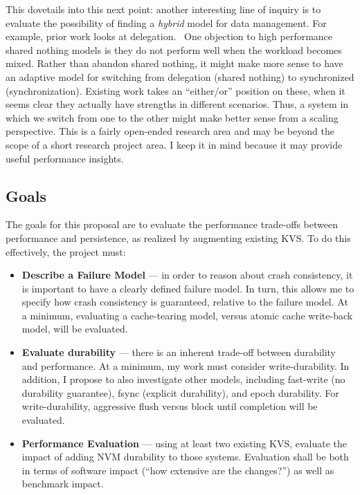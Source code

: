 \documentclass[letterpaper,twocolumn,10pt]{article}
\begin{document}
This dovetails into this next point: another interesting line of inquiry is to evaluate the possibility of finding a \textit{hybrid} model for
data management.  For example, prior work
looks at delegation.~\cite{roghanchi2017ffwd,calciu2013message}  One objection to high performance shared nothing models is they do not perform well
when the workload becomes mixed.  Rather than abandon shared nothing, it might make more sense to have an adaptive model for switching from delegation
(shared nothing) to synchronized (synchronization).  Existing work takes an ``either/or'' position on these, when it seems clear they actually have
strengths in different scenarios.  Thus, a system in which we switch from one to the other might make better sense from a scaling perspective.  This
is a fairly open-ended research area and may be beyond the scope of a short research project area.  I keep it in mind because it may provide useful
performance insights.

\subsection{Goals}

The goals for this proposal are to evaluate the performance trade-offs between performance and persistence, as realized by augmenting existing KVS.  To do this
effectively, the project must:

\begin{itemize}
    \item \textbf{Describe a Failure Model} --- in order to reason about crash consistency, it is important to have a clearly defined failure model.  In turn, this
    allows me to specify how crash consistency is guaranteed, relative to the failure model.  At a minimum, evaluating a cache-tearing model, versus atomic cache
    write-back model, will be evaluated.

    \item \textbf{Evaluate durability} --- there is an inherent trade-off between durability and performance.  At a minimum, my work must consider write-durability.
    In addition, I propose to also investigate other models, including fast-write (no durability guarantee), fsync (explicit durability), and epoch durability.
    For write-durability, aggressive flush versus block until completion will be evaluated.

    \item \textbf{Performance Evaluation} --- using at least two existing KVS, evaluate the impact of adding NVM durability to those systems.  Evaluation shall
    be both in terms of software impact (``how extensive are the changes?'') as well as benchmark impact.

\end{itemize}
\end{document}
